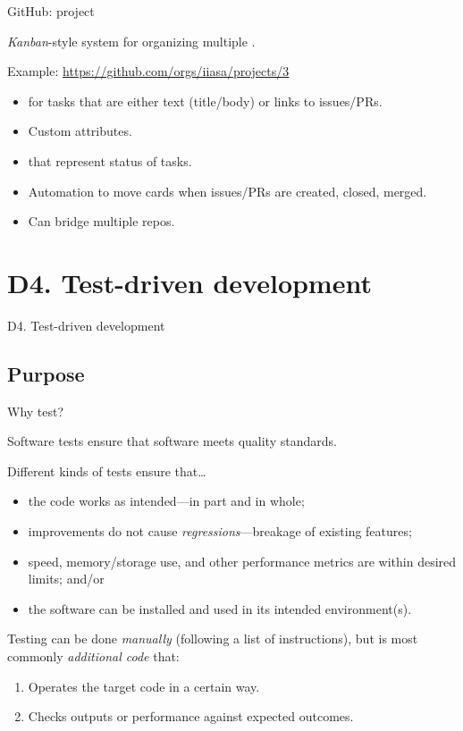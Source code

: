 \documentclass[12pt,aspectratio=169]{beamer}
\begin{document}
\begin{frame}{GitHub: project}

  {\Large \emph{Kanban}-style system for organizing multiple .}

  \bigskip
  Example: \url{https://github.com/orgs/iiasa/projects/3}

  \begin{itemize}
    \item {} for tasks that are either text (title/body) or links to issues/PRs.
    \item Custom attributes.
    \item {} that represent status of tasks.
    \item Automation to move cards when issues/PRs are created, closed, merged.
    \item Can bridge multiple repos.
  \end{itemize}

\end{frame}

\section{D4. Test-driven development}
\begin{frame}{D4. Test-driven development}
  \tableofcontents[hideothersubsections]
\end{frame}

\subsection{Purpose}
\begin{frame}{Why test?}

  Software tests ensure that software meets quality standards.

  \bigskip
  Different kinds of tests ensure that…
  \begin{itemize}
    \item the code works as intended—in part and in whole;
    \item improvements do not cause \emph{regressions}—breakage of existing features;
    \item speed, memory/storage use, and other performance metrics are within desired limits; and/or
    \item the software can be installed and used in its intended environment(s).
  \end{itemize}

  \bigskip
  Testing can be done \emph{manually} (following a list of instructions), but is most commonly \emph{additional code} that:
  \begin{enumerate}
    \item Operates the target code in a certain way.
    \item Checks outputs or performance against expected outcomes.
  \end{enumerate}

\end{frame}
\end{document}

